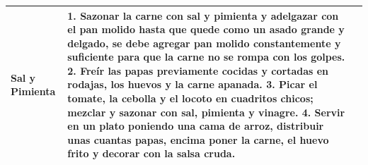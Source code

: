 \documentclass[menu.tex]{subfiles}
\begin{document}
\begin{tabular} {p{3.5cm} p{4cm} p{9cm}}
\begin{compactitem}
\begin{footnotesize}
                \item Sal y Pimienta
            \end{footnotesize}
        \end{compactitem}&
        \vspace{-1.8cm}
        1. Sazonar la carne con sal y pimienta y adelgazar con el pan molido hasta que quede como un asado grande y delgado, se debe agregar pan molido constantemente y suficiente para que la carne no se rompa con los golpes.
        2. Freír las papas previamente cocidas y cortadas en rodajas, los huevos y la carne apanada.     3. Picar el tomate, la cebolla y el locoto en cuadritos chicos; mezclar y sazonar con sal, pimienta y vinagre.
        4. Servir en un plato poniendo una cama de arroz, distribuir unas cuantas papas, encima poner la carne, el huevo frito y decorar con la salsa cruda.\\
        \hline
        

\end{tabular}
\end{document}
